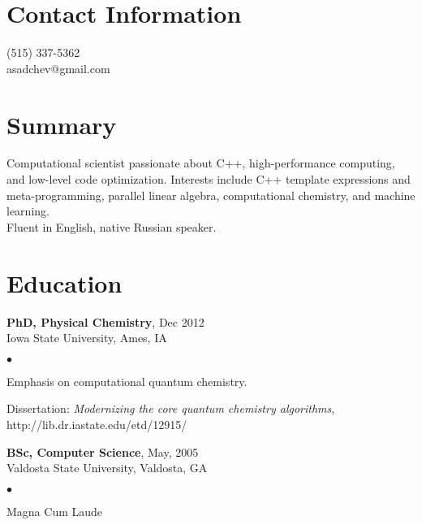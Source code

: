 \documentclass[overlap,line]{cv}
\newenvironment{list2}{
  \begin{list}{$\bullet$}{%
      \setlength{\itemsep}{0in}
      \setlength{\parsep}{0in} \setlength{\parskip}{0in}
      \setlength{\topsep}{0in} \setlength{\partopsep}{0in} 
      \setlength{\leftmargin}{0.2in}}}{\end{list}}
\begin{document}

\begin{resume}
\section{\sc Contact Information}
\vspace{.05in}
(515) 337-5362 \\
asadchev@gmail.com

\section{\sc Summary}
\vspace{.05in}
Computational scientist passionate about C++, high-performance computing, and low-level code optimization.
Interests include C++ template expressions and meta-programming, parallel linear algebra,
computational chemistry, and machine learning. \\
Fluent in English, native Russian speaker.


\section{\sc Education}
\vspace{.05in}
{\bf PhD, Physical Chemistry}, Dec 2012 \\
Iowa State University, Ames, IA
\vspace*{.02in}
\begin{list2}
\item Emphasis on computational quantum chemistry.
\item Dissertation: {\it Modernizing the core quantum chemistry algorithms}, \\
 {http://lib.dr.iastate.edu/etd/12915/}
\end{list2}

{\bf BSc, Computer Science},  May, 2005\\
Valdosta State University, Valdosta, GA
\vspace*{.02in}
\begin{list2}
\item Magna Cum Laude
\end{list2}



\end{resume}
\end{document}
